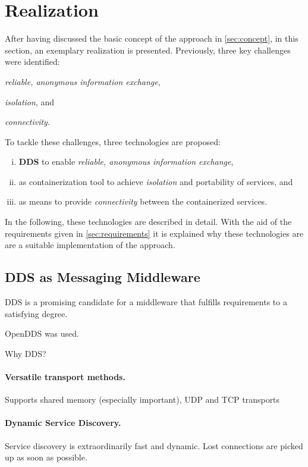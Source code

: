 \section{Realization} \label{sec:realization}
After having discussed the basic concept of the approach in \autoref{sec:concept}, in this section, an exemplary realization is presented. Previously, three key challenges were identified:
\begin{inparaenum}[(i)]
  \item \emph{reliable, anonymous information exchange},
  \item \emph{isolation}, and
  \item \emph{connectivity}. 
\end{inparaenum}
To tackle these challenges, three technologies are proposed:

\begin{enumerate}[(i)]
\item \textbf{DDS} to enable \emph{reliable, anonymous information exchange},
\item \textbf{\docker} as containerization tool to achieve \emph{isolation} and portability of services, and
\item \textbf{\wnet} as means to provide \emph{connectivity} between the containerized services.
\end{enumerate}

In the following, these technologies are described in detail. With the aid of the requirements given in \autoref{sec:requirements} it is explained why these technologies are are a suitable implementation of the  approach. 


\subsection{DDS as Messaging Middleware}

DDS is a promising candidate for a middleware that fulfills requirements to a satisfying degree.

OpenDDS was used.

Why DDS?

\paragraph{Versatile transport methods.} Supports shared memory (especially important), UDP and TCP transports

\paragraph{Dynamic Service Discovery.} Service discovery is extraordinarily fast and dynamic. Lost connections are picked up as soon as possible.


